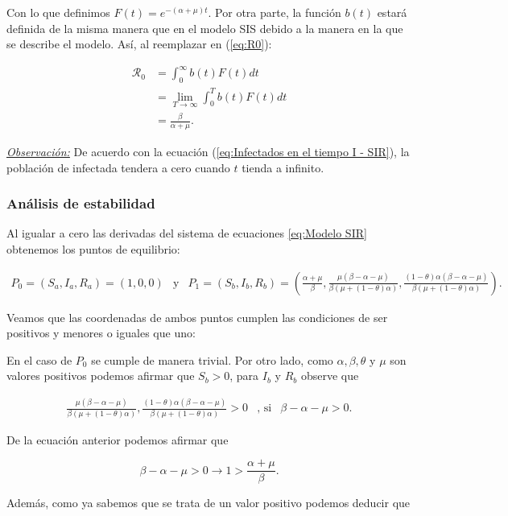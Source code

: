 Con lo que definimos $F(t)=e^{-(\alpha+\mu)t}$. Por otra parte, la función $b(t)$ estará definida de la misma manera que en el modelo SIS debido a la manera en la que se describe el modelo. Así, al reemplazar en (\ref{eq:R0}):

\begin{align*}
\mathcal{R}_0 &= \int_0^\infty b(t)F(t) dt \\
&= \lim_{T\to\infty} \int_0^T b(t)F(t) dt \\
&= \frac{\beta}{\alpha+\mu}.
\end{align*}

\underline{\textit{Observación:}} De acuerdo con la ecuación (\ref{eq:Infectados en el tiempo I - SIR}), la población de infectada tendera a cero cuando $t$ tienda a infinito.

\subsubsection{Análisis de estabilidad}

Al igualar a cero las derivadas del sistema de ecuaciones \ref{eq:Modelo SIR} obtenemos los puntos de equilibrio:

$$\begin{array}{ccc}
P_0=(S_a,I_a,R_a)=(1,0,0) & \text{y} & P_1=(S_b,I_b,R_b)=\left(\frac{\alpha+\mu}{\beta},\frac{\mu(\beta-\alpha-\mu)}{\beta(\mu+(1-\theta)\alpha)},\frac{(1-\theta)\alpha(\beta-\alpha-\mu)}{\beta(\mu+(1-\theta)\alpha)}\right).
\end{array}$$

Veamos que las coordenadas de ambos puntos cumplen las condiciones de ser positivos y menores o iguales que uno: 

En el caso de $P_0$ se cumple de manera trivial. Por otro lado, como $\alpha,\beta,\theta$ y $\mu$ son valores positivos podemos afirmar que $S_b>0$, para $I_b$ y $R_b$ observe que 

$$\begin{array}{ccc}
\frac{\mu(\beta-\alpha-\mu)}{\beta(\mu+(1-\theta)\alpha)},\frac{(1-\theta)\alpha(\beta-\alpha-\mu)}{\beta(\mu+(1-\theta)\alpha)}>0 & \text{, si} & \beta-\alpha-\mu>0.
\end{array}$$

De la ecuación anterior podemos afirmar que 

$$\beta-\alpha-\mu>0\longrightarrow1>\frac{\alpha+\mu}{\beta}.$$

Además, como ya sabemos que se trata de un valor positivo podemos deducir que 

